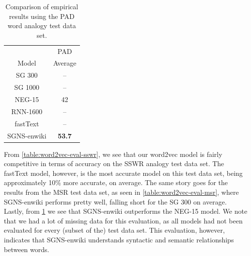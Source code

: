 \begin{table}[H]
    \centering
    \begin{tabular}{@{}cc@{}}
    \toprule
    & PAD \\
    \cmidrule(l){2-2}
    \multirow{-2}{*}{Model} & Average \\
    \midrule
    \trcolor
    SG 300 & -- \\
    SG 1000 & -- \\
    \trcolor
    NEG-15 & 42 \\
    RNN-1600 & -- \\
    \trcolor
    fastText & -- \\
    SGNS-enwiki & \textbf{53.7} \\
    \bottomrule
    \end{tabular}
    \caption{Comparison of empirical results using the PAD word analogy test data set.}
    \label{table:word2vec-eval-pad}
\end{table}

From \cref{table:word2vec-eval-sswr}, we see that our word2vec model is fairly competitive in terms of accuracy on the SSWR analogy test data set. The fastText model, however, is the most accurate model on this test data set, being approximately 10\% more accurate, on average. The same story goes for the results from the MSR test data set, as seen in \cref{table:word2vec-eval-msr}, where SGNS-enwiki performs pretty well, falling short for the SG 300 on average. Lastly, from \cref{table:word2vec-eval-pad} we see that SGNS-enwiki outperforms the NEG-15 model. We note that we had a lot of missing data for this evaluation, as all models had not been evaluated for every (subset of the) test data set. This evaluation, however, indicates that SGNS-enwiki understands syntactic and semantic relationships between words.

